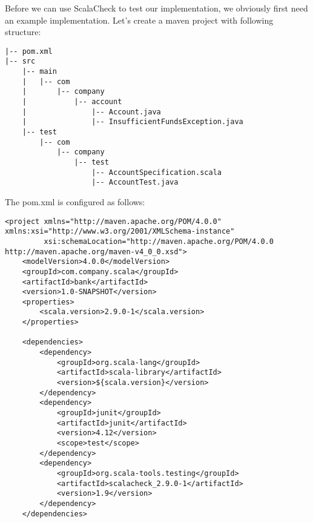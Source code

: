 \documentclass{article}
\begin{document}
Before we can use ScalaCheck to test our implementation, we obviously
first need an example implementation. Let's create a maven project
with following structure:

\begin{lstlisting}
|-- pom.xml
|-- src
    |-- main
    |   |-- com
    |       |-- company
    |           |-- account
    |               |-- Account.java
    |               |-- InsufficientFundsException.java
    |-- test
        |-- com
            |-- company
                |-- test
                    |-- AccountSpecification.scala
                    |-- AccountTest.java
\end{lstlisting}

The pom.xml is configured as follows:

\begin{lstlisting}
<project xmlns="http://maven.apache.org/POM/4.0.0" xmlns:xsi="http://www.w3.org/2001/XMLSchema-instance"
         xsi:schemaLocation="http://maven.apache.org/POM/4.0.0 http://maven.apache.org/maven-v4_0_0.xsd">
    <modelVersion>4.0.0</modelVersion>
    <groupId>com.company.scala</groupId>
    <artifactId>bank</artifactId>
    <version>1.0-SNAPSHOT</version>
    <properties>
        <scala.version>2.9.0-1</scala.version>
    </properties>

    <dependencies>
        <dependency>
            <groupId>org.scala-lang</groupId>
            <artifactId>scala-library</artifactId>
            <version>${scala.version}</version>
        </dependency>
        <dependency>
            <groupId>junit</groupId>
            <artifactId>junit</artifactId>
            <version>4.12</version>
            <scope>test</scope>
        </dependency>
        <dependency>
            <groupId>org.scala-tools.testing</groupId>
            <artifactId>scalacheck_2.9.0-1</artifactId>
            <version>1.9</version>
        </dependency>
    </dependencies>


\end{lstlisting}
\end{document}
